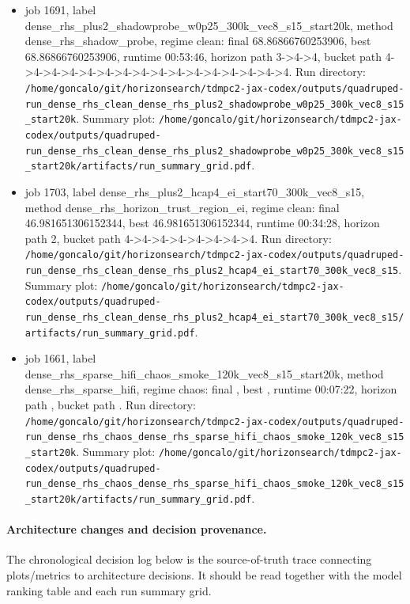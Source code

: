 \begin{itemize}
\item job 1691, label dense\_rhs\_plus2\_shadowprobe\_w0p25\_300k\_vec8\_s15\_start20k, method dense\_rhs\_shadow\_probe, regime clean: final 68.86866760253906, best 68.86866760253906, runtime 00:53:46, horizon path 3->4->4, bucket path 4->4->4->4->4->4->4->4->4->4->4->4->4->4->4->4. Run directory: \texttt{/home/goncalo/git/horizonsearch/tdmpc2-jax-codex/outputs/quadruped-run\_dense\_rhs\_clean\_dense\_rhs\_plus2\_shadowprobe\_w0p25\_300k\_vec8\_s15\_start20k}. Summary plot: \texttt{/home/goncalo/git/horizonsearch/tdmpc2-jax-codex/outputs/quadruped-run\_dense\_rhs\_clean\_dense\_rhs\_plus2\_shadowprobe\_w0p25\_300k\_vec8\_s15\_start20k/artifacts/run\_summary\_grid.pdf}.
\item job 1703, label dense\_rhs\_plus2\_hcap4\_ei\_start70\_300k\_vec8\_s15, method dense\_rhs\_horizon\_trust\_region\_ei, regime clean: final 46.981651306152344, best 46.981651306152344, runtime 00:34:28, horizon path 2, bucket path 4->4->4->4->4->4->4->4. Run directory: \texttt{/home/goncalo/git/horizonsearch/tdmpc2-jax-codex/outputs/quadruped-run\_dense\_rhs\_clean\_dense\_rhs\_plus2\_hcap4\_ei\_start70\_300k\_vec8\_s15}. Summary plot: \texttt{/home/goncalo/git/horizonsearch/tdmpc2-jax-codex/outputs/quadruped-run\_dense\_rhs\_clean\_dense\_rhs\_plus2\_hcap4\_ei\_start70\_300k\_vec8\_s15/artifacts/run\_summary\_grid.pdf}.
\item job 1661, label dense\_rhs\_sparse\_hifi\_chaos\_smoke\_120k\_vec8\_s15\_start20k, method dense\_rhs\_sparse\_hifi, regime chaos: final , best , runtime 00:07:22, horizon path , bucket path . Run directory: \texttt{/home/goncalo/git/horizonsearch/tdmpc2-jax-codex/outputs/quadruped-run\_dense\_rhs\_chaos\_dense\_rhs\_sparse\_hifi\_chaos\_smoke\_120k\_vec8\_s15\_start20k}. Summary plot: \texttt{/home/goncalo/git/horizonsearch/tdmpc2-jax-codex/outputs/quadruped-run\_dense\_rhs\_chaos\_dense\_rhs\_sparse\_hifi\_chaos\_smoke\_120k\_vec8\_s15\_start20k/artifacts/run\_summary\_grid.pdf}.
\end{itemize}

\paragraph{Architecture changes and decision provenance.}
The chronological decision log below is the source-of-truth trace connecting plots/metrics to architecture decisions. It should be read together with the model ranking table and each run summary grid.

